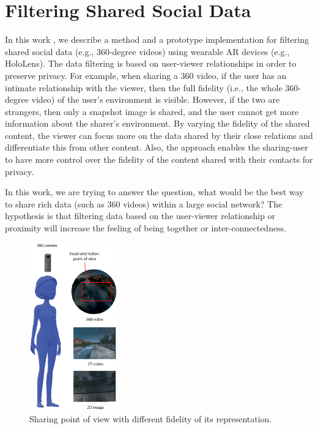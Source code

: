 \section{Filtering Shared Social Data}
\label{sec:surrounding:360}

In this work \cite{Nassani2018a}, we describe a method and a prototype implementation for filtering shared social data (e.g., 360-degree videos) using wearable AR devices (e.g., HoloLens). The data filtering is based on user-viewer relationships in order to preserve privacy. For example, when sharing a 360 video, if the user has an intimate relationship with the viewer, then the full fidelity (i.e., the whole 360-degree video) of the user's environment is visible. However, if the two are strangers, then only a snapshot image is shared, and the user cannot get more information about the sharer's environment. By varying the fidelity of the shared content, the viewer can focus more on the data shared by their close relations and differentiate this from other content. Also, the approach enables the sharing-user to have more control over the fidelity of the content shared with their contacts for privacy.

In this work, we are trying to answer the question, what would be the best way to share rich data (such as 360 videos) within a large social network? The hypothesis is that filtering data based on the user-viewer relationship or proximity will increase the feeling of being together or inter-connectedness. 

\begin{figure}[ht]
    \centering
    \includegraphics[width=1.5in]{images/chi/images-04.eps}
    \caption{Sharing point of view with different fidelity of its representation.}
    \label{fig:data:sharer}
\end{figure}

